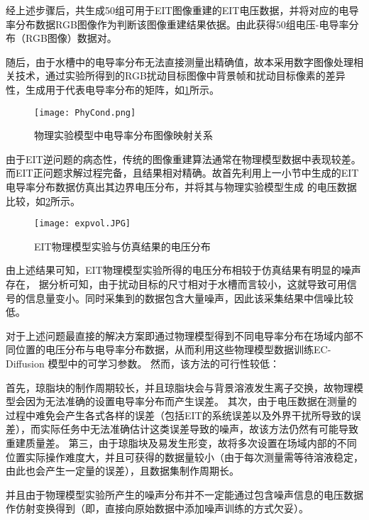 经上述步骤后，共生成50组可用于EIT图像重建的EIT电压数据，并将对应的电导率分布数据RGB图像作为判断该图像重建结果依据。由此获得50组电压-电导率分布（RGB图像）数据对。

随后，由于水槽中的电导率分布无法直接测量出精确值，故本采用数字图像处理相关技术，通过实验所得到的RGB扰动目标图像中背景帧和扰动目标像素的差异性，生成用于代表电导率分布的矩阵，如\cref{figure:PhyCond}所示。
\begin{figure}[H]
    \centering
    \texttt{[image: PhyCond.png]}
    \caption{物理实验模型中电导率分布图像映射关系}
    \label{figure:PhyCond}
\end{figure}

\label{NoiseRob}
由于EIT逆问题的病态性，传统的图像重建算法通常在物理模型数据中表现较差。而EIT正问题求解过程完备，且结果相对精确。故首先利用上一小节中生成的EIT电导率分布数据仿真出其边界电压分布，并将其与物理实验模型生成
的电压数据比较，如\cref{figure:expvol}所示。


\begin{figure}[h]
    \centering
    \texttt{[image: expvol.JPG]}
    \caption{EIT物理模型实验与仿真结果的电压分布}
    \label{figure:expvol}
\end{figure}

由上述结果可知，EIT物理模型实验所得的电压分布相较于仿真结果有明显的噪声存在，
据分析可知，由于扰动目标的尺寸相对于水槽而言较小，这就导致可用信号的信息量变小。同时采集到的数据包含大量噪声，因此该采集结果中信噪比较低。

对于上述问题最直接的解决方案即通过物理模型得到不同电导率分布在场域内部不同位置的电压分布与电导率分布数据，从而利用这些物理模型数据训练EC-Diffusion 模型中的可学习参数。
然而，该方法的可行性较低：

首先，琼脂块的制作周期较长，并且琼脂块会与背景溶液发生离子交换，故物理模型会因为无法准确的设置电导率分布而产生误差。
其次，由于电压数据在测量的过程中难免会产生各式各样的误差（包括EIT的系统误差以及外界干扰所导致的误差），而实际任务中无法准确估计这类误差导致的噪声，故该方法仍然有可能导致重建质量差。
第三，由于琼脂块及易发生形变，故将多次设置在场域内部的不同位置实际操作难度大，并且可获得的数据量较小（由于每次测量需等待溶液稳定，由此也会产生一定量的误差），且数据集制作周期长。

并且由于物理模型实验所产生的噪声分布并不一定能通过包含噪声信息的电压数据作仿射变换得到（即，直接向原始数据中添加噪声训练的方式欠妥）。

